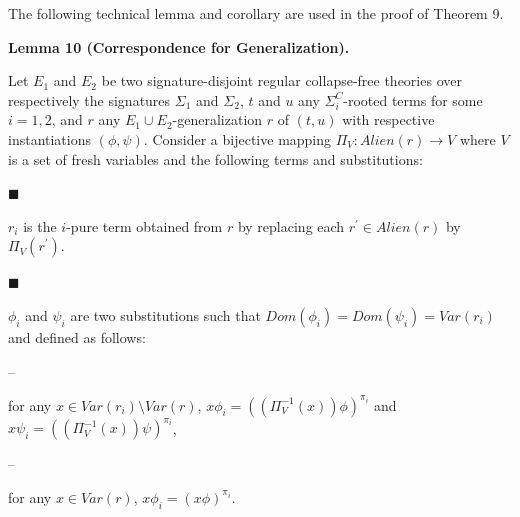  
 
The following technical lemma and corollary are used in the proof of Theorem 9.\par
 
 
 
\par\medskip\noindent\textbf{Lemma 10 (Correspondence for Generalization).}\par
 
 
Let $E_{1}$ and $E_{2}$ be two signature-disjoint regular collapse-free theories over respectively the signatures $\Sigma_{1}$ and $\Sigma_{2}$, $t$ and $u$ any ${\Sigma}^{C}_{i}$-rooted terms for some $i=1,2$, and $r$ any $E_{1}\cup E_{2}$-generalization $r$ of $(t,u)$ with respective instantiations $(\phi,\psi)$. Consider a bijective mapping $\Pi_{V}:Alien(r)\rightarrow V$ where $V$ is a set of fresh variables and the following terms and substitutions:\par
  
\par\noindent  $\blacksquare$ 
 
$r_{i}$ is the $i$-pure term obtained from $r$ by replacing each $r^{\prime}\in Alien(r)$ by $\Pi_{V}(r^{\prime})$.\par
 
 
 
\par\noindent  $\blacksquare$ 
 
$\phi_{i}$ and $\psi_{i}$ are two substitutions such that $\mathit{Dom}(\phi_{i})=\mathit{Dom}(\psi_{i})=\mathit{Var}(r_{i})$ and defined as follows:\par
  
\par\noindent  – 
 
for any $x\in\mathit{Var}(r_{i})\setminus\mathit{Var}(r)$, $x\phi_{i}=((\Pi_{V}^{-1}(x))\phi)^{\pi_{i}}$ and $x\psi_{i}=((\Pi_{V}^{-1}(x))\psi)^{\pi_{i}}$,\par
 
 
 
\par\noindent  – 
 
for any $x\in\mathit{Var}(r)$, $x\phi_{i}=(x\phi)^{\pi_{i}}$.\par
 
